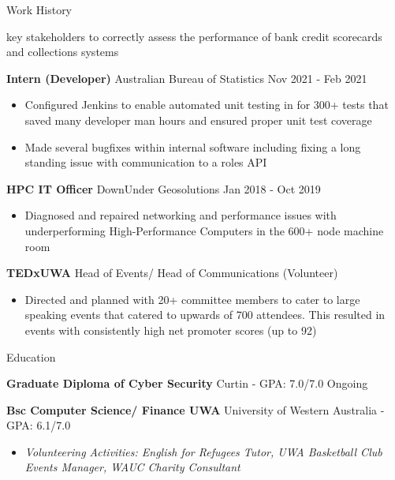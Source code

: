 \documentclass{resume} %
\begin{document}
\begin{rSection}{Work History}
\begin{itemize}
key stakeholders to correctly assess the performance of bank credit scorecards and collections systems
		\end{itemize}
		\item \textbf{Intern (Developer)} {Australian Bureau of Statistics} \hfill Nov  2021 - Feb 2021
		\begin{itemize} 
			\item Configured Jenkins to enable automated unit testing in for 300+ tests that saved many developer man hours and ensured proper unit test coverage
			\item Made several bugfixes within internal software including fixing a long standing issue with communication to a roles API
		\end{itemize}
		

		\item \textbf{HPC IT Officer} {DownUnder Geosolutions} \hfill Jan 2018 - Oct 2019
		\begin{itemize} 

			\item  Diagnosed and repaired networking and performance issues with underperforming High-Performance Computers in the 600+ node machine room
		\end{itemize}

		\item \textbf{TEDxUWA} {Head of Events/ Head of Communications} (Volunteer) 
		\begin{itemize} 
			\item Directed and planned with 20+ committee members to cater to large speaking events that catered to upwards of 700 attendees. This resulted in events with consistently high net promoter scores (up to 92)  
		\end{itemize}
	\end{rSection} 
	
	\begin{rSection}{Education}
		\vspace{-1.25em}
		\item \textbf{Graduate Diploma of Cyber Security} {Curtin} - GPA: 7.0/7.0 \hfill Ongoing
		\item \textbf{Bsc Computer Science/ Finance UWA} {University of Western Australia} - GPA: 6.1/7.0 \hfill 
		\begin{itemize} 
			\scriptsize\item \textit{Volunteering Activities: English for Refugees Tutor, UWA Basketball Club Events Manager, WAUC Charity Consultant} \hfill
		\end{itemize}
	\end{rSection} 
\end{document}
